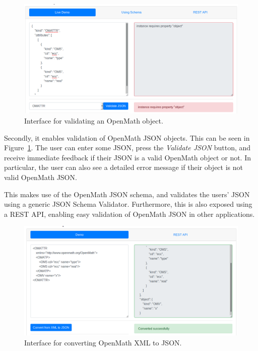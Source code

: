 \begin{figure}
    \centering
        \includegraphics[width=\textwidth]{images/validate}
    \caption{Interface for validating an OpenMath object. }
    \label{figure:validate}
\end{figure}
Secondly, it enables validation of OpenMath JSON objects. This can be seen in Figure~\ref{figure:validate}.
The user can enter some JSON, press the \textit{Validate JSON} button, and receive immediate feedback if their JSON is a valid OpenMath object or not. 
In particular, the user can also see a detailed error message if their object is not valid OpenMath JSON. 

This makes use of the OpenMath JSON schema, and validates the users' JSON using a generic JSON Schema Validator. 
Furthermore, this is also exposed using a REST API, enabling easy validation of OpenMath JSON in other applications. 

\begin{figure}
    \centering
        \includegraphics[width=\textwidth]{images/xml2json}
    \caption{Interface for converting OpenMath XML to JSON. }
    \label{figure:xml2json}
\end{figure}

